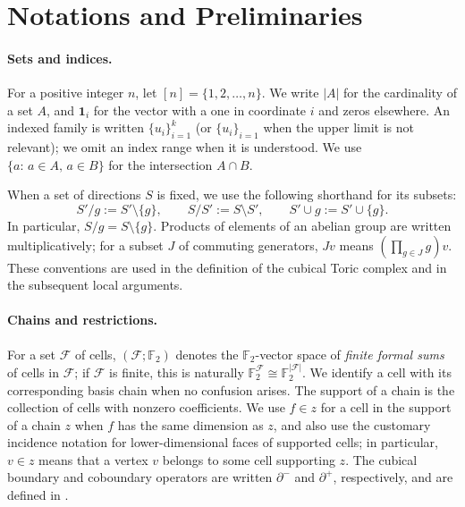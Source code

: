\section{Notations and Preliminaries}\label{sec:nota}

\paragraph{Sets and indices.}
For a positive integer $n$, let $[n]=\{1,2,\ldots,n\}$. We write $|A|$ for the cardinality of a set $A$, and $\mathbf{1}_i$ for the vector with a one in coordinate $i$ and zeros elsewhere. An indexed family is written $\{u_i\}_{i=1}^k$ (or $\{u_i\}_{i=1}$ when the upper limit is not relevant); we omit an index range when it is understood. We use $\{a:\,a\in A,\,a\in B\}$ for the intersection $A\cap B$.

When a set of directions $S$ is fixed, we use the following shorthand for its subsets:
\begin{equation*}
  S'/g := S'\setminus\{g\},\qquad
  S/S' := S\setminus S',\qquad
  S'\cup g := S'\cup\{g\}.
\end{equation*}
In particular, $S/g=S\setminus\{g\}$. Products of elements of an abelian group are written multiplicatively; for a subset $J$ of commuting generators, $Jv$ means $(\prod_{g\in J}g)v$. These conventions are used in the definition of the cubical Toric complex and in the subsequent local arguments.

\paragraph{Chains and restrictions.}
For a set $\mathcal F$ of cells, $(\mathcal F;\mathbb F_2)$ denotes the $\mathbb F_2$-vector space of \emph{finite formal sums} of cells in $\mathcal F$; if $\mathcal F$ is finite, this is naturally $\mathbb F_2^{\mathcal F}\cong\mathbb F_2^{|\mathcal F|}$. We identify a cell with its corresponding basis chain when no confusion arises. The support of a chain is the collection of cells with nonzero coefficients. We use $f\in z$ for a cell in the support of a chain $z$ when $f$ has the same dimension as $z$, and also use the customary incidence notation for lower-dimensional faces of supported cells; in particular, $v\in z$ means that a vertex $v$ belongs to some cell supporting $z$. The cubical boundary and coboundary operators are written $\partial^{-}$ and $\partial^{+}$, respectively, and are defined in .

